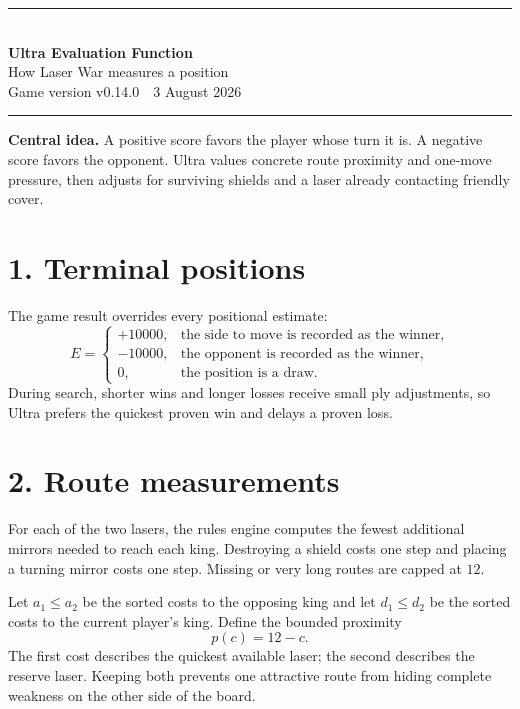 \documentclass[11pt]{article}
\newcommand{\GameVersion}{v0.14.0}
\newcommand{\MateScore}{10000}
\newcommand{\RouteLimit}{12}
\begin{document}
\begin{center}
  {\color{cyan}\rule{0.88\textwidth}{2.2pt}}\\[1.1em]
  {\Huge\bfseries\color{ink} Ultra Evaluation Function}\\[0.5em]
  {\Large\color{muted}How Laser War measures a position}\\[0.8em]
  {\small\color{muted}Game version \GameVersion\ \textbullet\ 3 August 2026}
  \\[1.1em]
  {\color{cyan}\rule{0.88\textwidth}{0.6pt}}
\end{center}

\vspace{0.5em}

\colorbox{panel}{%
  \parbox{\dimexpr\textwidth-2\fboxsep\relax}{%
    \textbf{Central idea.}
    A positive score favors the player whose turn it is. A negative score favors
    the opponent. Ultra values concrete route proximity and one-move pressure,
    then adjusts for surviving shields and a laser already contacting friendly cover.
  }%
}

\section*{1. Terminal positions}

The game result overrides every positional estimate:
\[
E =
\begin{cases}
+\MateScore, & \text{the side to move is recorded as the winner},\\
-\MateScore, & \text{the opponent is recorded as the winner},\\
0, & \text{the position is a draw}.
\end{cases}
\]
During search, shorter wins and longer losses receive small ply adjustments, so
Ultra prefers the quickest proven win and delays a proven loss.

\section*{2. Route measurements}

For each of the two lasers, the rules engine computes the fewest additional
mirrors needed to reach each king. Destroying a shield costs one step and placing
a turning mirror costs one step. Missing or very long routes are capped at
\(\RouteLimit\).

Let \(a_1\leq a_2\) be the sorted costs to the opposing king and let
\(d_1\leq d_2\) be the sorted costs to the current player's king. Define the
bounded proximity
\[
p(c)=\RouteLimit-c.
\]
The first cost describes the quickest available laser; the second describes the
reserve laser. Keeping both prevents one attractive route from hiding complete
weakness on the other side of the board.
\end{document}
